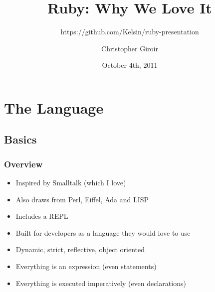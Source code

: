 \usepackage{color}
\usepackage{float}
\usepackage{minted}



\usepackage{beamerthemesplit}


\title{Ruby: Why We Love It}
\subtitle{https://github.com/Kelsin/ruby-presentation}
\author{Christopher Giroir}
\date{October 4th, 2011}




\maketitle

\begin{frame}
  \titlepage
\end{frame}

\begin{frame}
  \tableofcontents
\end{frame}

\section{The Language}

\subsection{Basics}

\begin{frame}
  \frametitle{Overview}
  \begin{itemize}
  \item Inspired by Smalltalk (which I love)
  \pause
  \item Also draws from Perl, Eiffel, Ada and LISP
  \pause
  \item Includes a REPL
  \pause
  \item Built for developers as a language they would love to use
  \pause
  \item Dynamic, strict, reflective, object oriented
  \pause
  \item Everything is an expression (even statements)
  \pause
  \item Everything is executed imperatively (even declarations)
  \end{itemize}
\end{frame}

